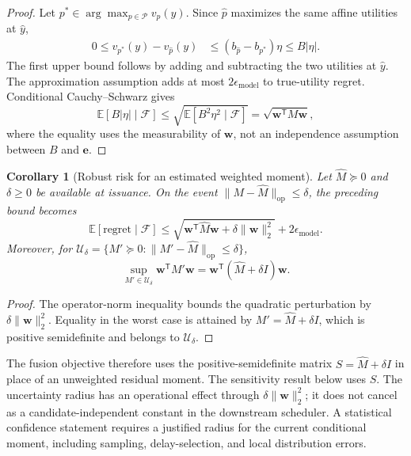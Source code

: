 \documentclass[10pt]{article}
\newtheorem{corollary}{Corollary}
\begin{document}
\begin{proof}
Let $p^*\in\arg\max_{p\in\mathcal P}v_p(y)$. Since $\widehat p$ maximizes
the same affine utilities at $\widehat y$,
\begin{align}
 0\le v_{p^*}(y)-v_{\widehat p}(y)
 &\le (b_{\widehat p}-b_{p^*})\eta
 \le B|\eta|.
\end{align}
The first upper bound follows by adding and subtracting the two utilities
at $\widehat y$. The approximation assumption adds at most
$2\epsilon_{\mathrm{model}}$ to true-utility regret. Conditional
Cauchy--Schwarz gives
\begin{equation}
 \mathbb E[B|\eta|\mid\mathcal F]
 \le\sqrt{\mathbb E[B^2\eta^2\mid\mathcal F]}
 =\sqrt{\boldsymbol w^{\mathsf T}M\boldsymbol w},
\end{equation}
where the equality uses the measurability of $\boldsymbol w$, not an
independence assumption between $B$ and $\boldsymbol e$.
\end{proof}

\begin{corollary}[Robust risk for an estimated weighted moment]
\label{cor:robust-decision-risk}
Let $\widehat M\succeq0$ and $\delta\ge0$ be available at issuance. On the
event $\|M-\widehat M\|_{\mathrm{op}}\le\delta$, the preceding bound becomes
\begin{equation}
 \mathbb E[\mathrm{regret}\mid\mathcal F]
 \le
 \sqrt{\boldsymbol w^{\mathsf T}\widehat M\boldsymbol w
       +\delta\|\boldsymbol w\|_2^2}
 +2\epsilon_{\mathrm{model}}.
 \label{eq:robust-decision-regret}
\end{equation}
Moreover, for
$\mathcal U_\delta=\{M'\succeq0:
 \|M'-\widehat M\|_{\mathrm{op}}\le\delta\}$,
\begin{equation}
 \sup_{M'\in\mathcal U_\delta}\boldsymbol w^{\mathsf T}M'\boldsymbol w
 =\boldsymbol w^{\mathsf T}(\widehat M+\delta I)\boldsymbol w.
 \label{eq:exact-robust-weighted-moment}
\end{equation}
\end{corollary}

\begin{proof}
The operator-norm inequality bounds the quadratic perturbation by
$\delta\|\boldsymbol w\|_2^2$. Equality in the worst case is attained by
$M'=\widehat M+\delta I$, which is positive semidefinite and belongs to
$\mathcal U_\delta$.
\end{proof}

The fusion objective therefore uses the positive-semidefinite matrix
$S=\widehat M+\delta I$ in place of an unweighted residual moment.
The sensitivity result below uses $S$. The uncertainty radius has an operational effect through
$\delta\|\boldsymbol w\|_2^2$; it does not cancel as a candidate-independent
constant in the downstream scheduler. A statistical confidence statement
requires a justified radius for the current conditional moment, including
sampling, delay-selection, and local distribution errors.
\end{document}
